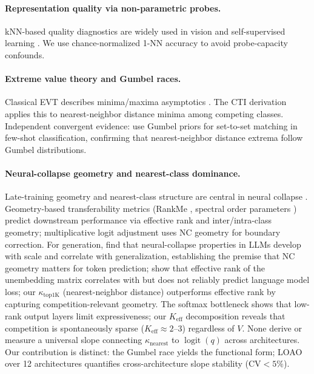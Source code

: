 \documentclass{article}
\DeclareMathOperator{\logit}{logit}
\begin{document}
\paragraph{Representation quality via non-parametric probes.}
kNN-based quality diagnostics are widely used in vision and self-supervised learning \citep{wu2018,caron2021}. We use chance-normalized 1-NN accuracy to avoid probe-capacity confounds.

\paragraph{Extreme value theory and Gumbel races.}
Classical EVT describes minima/maxima asymptotics \citep{fisher1928,gnedenko1943,gumbel1958}. The CTI derivation applies this to nearest-neighbor distance minima among competing classes. Independent convergent evidence: \citet{zhang2025gps} use Gumbel priors for set-to-set matching in few-shot classification, confirming that nearest-neighbor distance extrema follow Gumbel distributions.

\paragraph{Neural-collapse geometry and nearest-class dominance.}
Late-training geometry and nearest-class structure are central in neural collapse \citep{papyan2020,han2022,zhu2021,garrido2023,rangamani2023,wu2024linguistic,sukenik2025nc}. Geometry-based transferability metrics (RankMe \citep{garrido2023}, spectral order parameters \citep{liu2025}) predict downstream performance via effective rank and inter/intra-class geometry; multiplicative logit adjustment \citep{ye2024} uses NC geometry for boundary correction.
For generation, \citet{wu2024linguistic} find that neural-collapse properties in LLMs develop with scale and correlate with generalization, establishing the premise that NC geometry matters for token prediction; \citet{kulkarni2026disentangling} show that effective rank of the unembedding matrix correlates with but does not reliably predict language model loss; our $\kappa_\mathrm{top1K}$ (nearest-neighbor distance) outperforms effective rank by capturing competition-relevant geometry.
The softmax bottleneck \citep{yang2018softmax} shows that low-rank output layers limit expressiveness; our $K_\mathrm{eff}$ decomposition reveals that competition is spontaneously sparse ($K_\mathrm{eff}\approx 2$--$3$) regardless of $V$.
None derive or measure a universal slope connecting $\kappa_\mathrm{nearest}$ to $\logit(q)$ across architectures. Our contribution is distinct: the Gumbel race yields the functional form; LOAO over 12 architectures quantifies cross-architecture slope stability (CV$<5\%$).
\end{document}

